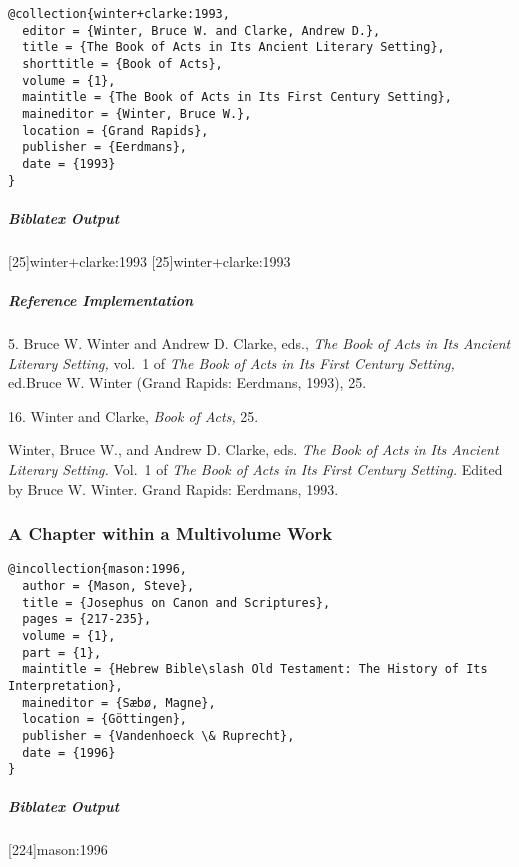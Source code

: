 \documentclass[a4paper]{article}
\newenvironment{biboutput}{%
  \subparagraph{Biblatex Output}
}{\color{black}}
\newenvironment{refimp}{%
  \subparagraph{Reference Implementation}
  \color{reference-colour}
  \rm
}{\par\color{black}}
\begin{document}
\begin{lstlisting}
@collection{winter+clarke:1993,
  editor = {Winter, Bruce W. and Clarke, Andrew D.},
  title = {The Book of Acts in Its Ancient Literary Setting},
  shorttitle = {Book of Acts},
  volume = {1},
  maintitle = {The Book of Acts in Its First Century Setting},
  maineditor = {Winter, Bruce W.},
  location = {Grand Rapids},
  publisher = {Eerdmans},
  date = {1993}
}
\end{lstlisting}  

\begin{biboutput}
  [25]{winter+clarke:1993}
  [25]{winter+clarke:1993}
\end{biboutput}

\begin{refimp}
  \hspace*{\bibindent}5. Bruce W. Winter and Andrew D. Clarke, eds., \emph{The
  Book of Acts in Its Ancient Literary Setting,} vol.~1 of \emph{The Book of
  Acts in Its First Century Setting,} ed.\@ Bruce W. Winter (Grand Rapids:
  Eerdmans, 1993), 25.

  \hspace*{\bibindent}16. Winter and Clarke, \emph{Book of Acts,} 25.

  \hangindent\bibindent Winter, Bruce W., and Andrew D. Clarke, eds. \emph{The
  Book of Acts in Its Ancient Literary Setting.} Vol.~1 of \emph{The Book of
  Acts in Its First Century Setting.} Edited by Bruce W. Winter. Grand Rapids:
  Eerdmans, 1993.
\end{refimp}

\subsubsection{A Chapter within a Multivolume Work}

\begin{lstlisting}
@incollection{mason:1996,
  author = {Mason, Steve},
  title = {Josephus on Canon and Scriptures},
  pages = {217-235},
  volume = {1},
  part = {1},
  maintitle = {Hebrew Bible\slash Old Testament: The History of Its Interpretation},
  maineditor = {Sæbø, Magne},
  location = {Göttingen},
  publisher = {Vandenhoeck \& Ruprecht},
  date = {1996}
}
\end{lstlisting}

\begin{biboutput}
  [224]{mason:1996}
\end{biboutput}
\end{document}
